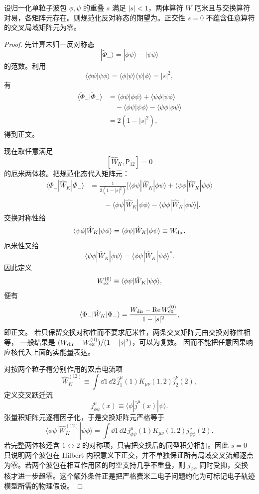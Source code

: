 \begin{proposition}[反对称双波包的直接与交换矩阵元]
设归一化单粒子波包 $\phi,\psi$ 的重叠 $s$ 满足 $|s|<1$，两体算符 $W$ 厄米且与交换算符对易，各矩阵元存在。则规范化反对称态的期望为。正交性 $s=0$ 不蕴含任意算符的交叉局域矩阵元为零。
\end{proposition}
\begin{proof}
先计算未归一反对称态
\[
|\widetilde\Phi_-\rangle
=
|\phi\psi\rangle-|\psi\phi\rangle
\]
的范数。利用
\[
\langle\phi\psi|\psi\phi\rangle
=
\langle\phi|\psi\rangle
\langle\psi|\phi\rangle
=
|s|^2,
\]
有
\begin{align*}
\langle\widetilde\Phi_-|\widetilde\Phi_-\rangle
&=
\langle\phi\psi|\phi\psi\rangle
+\langle\psi\phi|\psi\phi\rangle\\
&\quad-
\langle\phi\psi|\psi\phi\rangle
-\langle\psi\phi|\phi\psi\rangle\\
&=2(1-|s|^2),
\end{align*}
得到正文。

现在取任意满足
\[
[\hat W_K,\mathsf P_{12}]=0
\]
的厄米两体核。把规范化态代入矩阵元：
\begin{align*}
\langle\Phi_-|\hat W_K|\Phi_-\rangle
&=
\frac1{2(1-|s|^2)}
\Big[
\langle\phi\psi|\hat W_K|\phi\psi\rangle
+\langle\psi\phi|\hat W_K|\psi\phi\rangle\\
&\qquad
-\langle\phi\psi|\hat W_K|\psi\phi\rangle
-\langle\psi\phi|\hat W_K|\phi\psi\rangle
\Big].
\end{align*}
交换对称性给
\[
\langle\psi\phi|\hat W_K|\psi\phi\rangle
=
\langle\phi\psi|\hat W_K|\phi\psi\rangle
\equiv W_{\rm dir}.
\]
厄米性又给
\[
\langle\psi\phi|\hat W_K|\phi\psi\rangle
=
\langle\phi\psi|\hat W_K|\psi\phi\rangle^*.
\]
因此定义
\[
W_{\rm ex}^{(0)}
\equiv
\langle\phi\psi|\hat W_K|\psi\phi\rangle,
\]
便有
\[
\langle\Phi_-|\hat W_K|\Phi_-\rangle
=
\frac{
W_{\rm dir}-\operatorname{Re}W_{\rm ex}^{(0)}
}{
1-|s|^2},
\]
即正文。
若只保留交换对称性而不要求厄米性，两条交叉矩阵元由交换对称性相等，
一般结果是 $(W_{\rm dir}-W_{\rm ex}^{(0)})/(1-|s|^2)$，可以为复数。
因而不能把任意因果响应核代入上面的实能量表达。

对按两个粒子槽分别作用的双点电流项
\[
\hat W_K^{(12)}
\equiv
\int\dd1\,\dd2\,
\hat j_1^\mu(1)K_{\mu\nu}(1,2)\hat j_2^\nu(2),
\]
定义交叉跃迁流
\[
j_{\phi\psi}^{\mu}(x)
\equiv
\langle\phi|\hat j^\mu(x)|\psi\rangle.
\]
张量积矩阵元逐槽因子化，于是交换矩阵元严格等于
\[
\langle\phi\psi|\hat W_K^{(12)}|\psi\phi\rangle
=
\int\dd1\,\dd2\,
j_{\phi\psi}^{\mu}(1)
K_{\mu\nu}(1,2)
j_{\psi\phi}^{\nu}(2).
\]
若完整两体核还含 $1\leftrightarrow2$ 的对称项，只需把交换后的同型积分相加。因此 $s=0$ 只说明两个波包在 Hilbert 内积意义下正交，并不单独保证所有局域交叉流都逐点为零。若两个波包在相互作用区的时空支持几乎不重叠，则 $j_{\phi\psi}$ 同时受抑，交换核才进一步趋零。这个额外条件正是把严格费米二电子问题约化为可标记电子轨迹模型所需的物理假设。
\end{proof}


